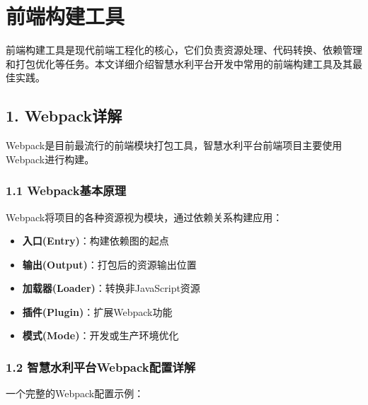 \section{前端构建工具}\label{ux524dux7aefux6784ux5efaux5de5ux5177}

前端构建工具是现代前端工程化的核心，它们负责资源处理、代码转换、依赖管理和打包优化等任务。本文详细介绍智慧水利平台开发中常用的前端构建工具及其最佳实践。

\subsection{1. Webpack详解}\label{webpackux8be6ux89e3}

Webpack是目前最流行的前端模块打包工具，智慧水利平台前端项目主要使用Webpack进行构建。

\subsubsection{1.1
Webpack基本原理}\label{webpackux57faux672cux539fux7406}

Webpack将项目的各种资源视为模块，通过依赖关系构建应用：

\begin{itemize}
\tightlist
\item
  \textbf{入口(Entry)}：构建依赖图的起点
\item
  \textbf{输出(Output)}：打包后的资源输出位置
\item
  \textbf{加载器(Loader)}：转换非JavaScript资源
\item
  \textbf{插件(Plugin)}：扩展Webpack功能
\item
  \textbf{模式(Mode)}：开发或生产环境优化
\end{itemize}

\subsubsection{1.2
智慧水利平台Webpack配置详解}\label{ux667aux6167ux6c34ux5229ux5e73ux53f0webpackux914dux7f6eux8be6ux89e3}

一个完整的Webpack配置示例：


